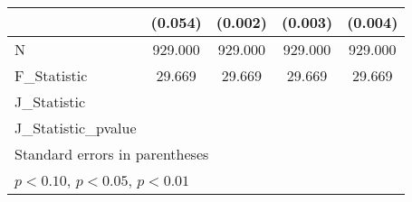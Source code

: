 {\begin{tabular}{l*{4}{c}}
            &     (0.054)         &     (0.002)         &     (0.003)         &     (0.004)         \\
\hline
N           &     929.000         &     929.000         &     929.000         &     929.000         \\
F\_Statistic &      29.669         &      29.669         &      29.669         &      29.669         \\
J\_Statistic &                     &                     &                     &                     \\
J\_Statistic\_pvalue&                     &                     &                     &                     \\
\hline\hline
\multicolumn{5}{l}{\footnotesize Standard errors in parentheses}\\
\multicolumn{5}{l}{\footnotesize \sym{*} \(p<0.10\), \sym{**} \(p<0.05\), \sym{***} \(p<0.01\)}\\
\end{tabular}
}
